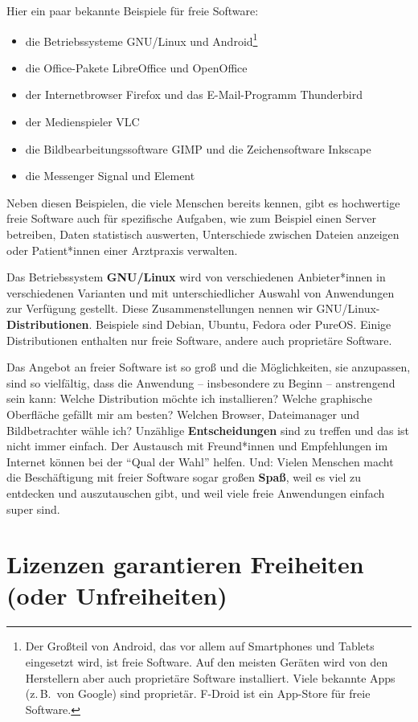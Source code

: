 \documentclass[a5paper,12pt]{scrartcl}
\begin{document}
Hier ein paar bekannte Beispiele für freie Software:
\begin{itemize}
\item die Betriebssysteme GNU/Linux und Android\footnote{Der Großteil
    von Android, das vor allem auf Smartphones und Tablets eingesetzt
    wird, ist freie Software. Auf den meisten Geräten wird von den
    Herstellern aber auch proprietäre Software installiert. Viele
    bekannte Apps (z.\,B.\ von Google) sind proprietär. F-Droid ist
    ein App-Store für freie Software.}
\item die Office-Pakete LibreOffice und OpenOffice
\item der Internetbrowser Firefox und das E-Mail-Programm Thunderbird
\item der Medienspieler VLC
\item die Bildbearbeitungssoftware GIMP und die Zeichensoftware
  Inkscape
\item die Messenger Signal und Element
\end{itemize}

Neben diesen Beispielen, die viele Menschen bereits kennen, gibt es
hochwertige freie Software auch für spezifische Aufgaben, wie zum
Beispiel einen Server betreiben, Daten statistisch auswerten,
Unterschiede zwischen Dateien anzeigen oder Patient*innen einer
Arztpraxis verwalten.

Das Betriebssystem \textbf{GNU/Linux} wird von verschiedenen
Anbieter*innen in verschiedenen Varianten und mit unterschiedlicher
Auswahl von Anwendungen zur Verfügung gestellt. Diese
Zusammenstellungen nennen wir
GNU/Linux-\textbf{Distributionen}. Beispiele sind Debian, Ubuntu,
Fedora oder PureOS. Einige Distributionen enthalten nur freie
Software, andere auch proprietäre Software.

Das Angebot an freier Software ist so groß und die Möglichkeiten, sie
anzupassen, sind so vielfältig, dass die Anwendung -- insbesondere zu
Beginn -- anstrengend sein kann: Welche Distribution möchte ich
installieren? Welche graphische Oberfläche gefällt mir am besten?
Welchen Browser, Dateimanager und Bildbetrachter wähle ich? Unzählige
\textbf{Entscheidungen} sind zu treffen und das ist nicht immer
einfach. Der Austausch mit Freund*innen und Empfehlungen im Internet
können bei der "`Qual der Wahl"' helfen. Und: Vielen Menschen macht
die Beschäftigung mit freier Software sogar großen \textbf{Spaß}, weil
es viel zu entdecken und auszutauschen gibt, und weil viele freie
Anwendungen einfach super sind.


\section{Lizenzen garantieren Freiheiten (oder Unfreiheiten)}
\end{document}
